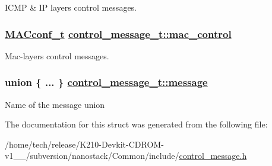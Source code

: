 ICMP \& IP layers control messages. \hypertarget{structcontrol__message__t_2f1fbfa937648a9d40ef18da0dd85a26}{
\subsubsection[mac\_\-control]{\setlength{\rightskip}{0pt plus 5cm}\hyperlink{structMACconf__t}{MACconf\_\-t} \hyperlink{structcontrol__message__t_2f1fbfa937648a9d40ef18da0dd85a26}{control\_\-message\_\-t::mac\_\-control}}}
\label{structcontrol__message__t_2f1fbfa937648a9d40ef18da0dd85a26}


Mac-layers control messages. \hypertarget{structcontrol__message__t_75a5f0af56a265cf8491405c290fef02}{
\subsubsection[message]{\setlength{\rightskip}{0pt plus 5cm}union \{ ... \}  \hyperlink{structcontrol__message__t_75a5f0af56a265cf8491405c290fef02}{control\_\-message\_\-t::message}}}
\label{structcontrol__message__t_75a5f0af56a265cf8491405c290fef02}


Name of the message union 

The documentation for this struct was generated from the following file:\begin{CompactItemize}
\item 
/home/tech/release/K210-Devkit-CDROM-v1\_\_/subversion/nanostack/Common/include/\hyperlink{control__message_8h}{control\_\-message.h}\end{CompactItemize}
